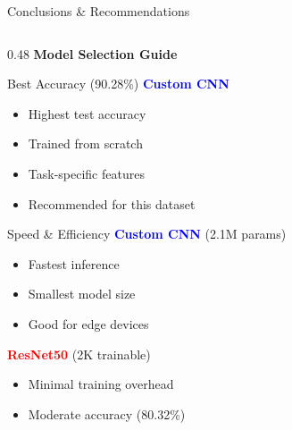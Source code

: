 \documentclass[aspectratio=169]{beamer}
\begin{document}
\begin{frame}{Conclusions \& Recommendations}
    \begin{columns}[T]
        \begin{column}{0.48\textwidth}
            \textbf{Model Selection Guide}
            
            \begin{block}{Best Accuracy (90.28\%)}
                \textcolor{blue}{\textbf{Custom CNN}}
                \begin{itemize}
                    \scriptsize
                    \item Highest test accuracy
                    \item Trained from scratch
                    \item Task-specific features
                    \item Recommended for this dataset
                \end{itemize}
            \end{block}
            
            \begin{block}{Speed \& Efficiency}
                \textcolor{blue}{\textbf{Custom CNN}} (2.1M params)
                \begin{itemize}
                    \scriptsize
                    \item Fastest inference
                    \item Smallest model size
                    \item Good for edge devices
                \end{itemize}
                
                \textcolor{red}{\textbf{ResNet50}} (2K trainable)
                \begin{itemize}
                    \scriptsize
                    \item Minimal training overhead
                    \item Moderate accuracy (80.32\%)
                \end{itemize}
            \end{block}
        \end{column}
        

\end{columns}
\end{frame}
\end{document}
